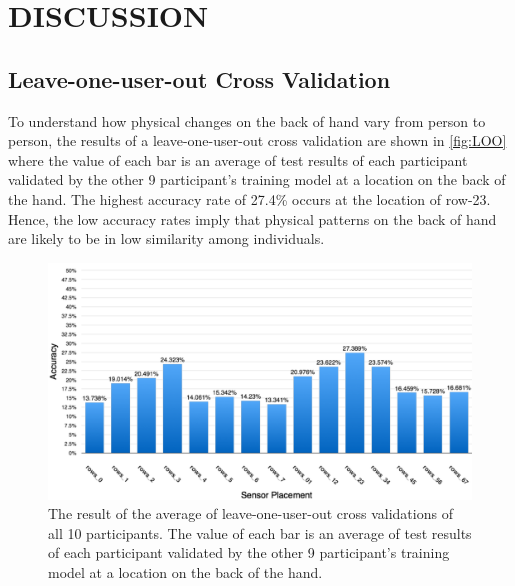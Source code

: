 \documentclass{sigchi}
\begin{document}
\section{DISCUSSION}

\subsection{Leave-one-user-out Cross Validation}
To understand how physical changes on the back of hand vary from person to person, the results of a leave-one-user-out cross validation are shown in \autoref{fig:LOO} where the value of each bar is an average of test results of each participant validated by the other 9 participant's training model at a location on the back of the hand. The highest accuracy rate of 27.4\% occurs at the location of row-23. Hence, the low accuracy rates imply that physical patterns on the back of hand are likely to be in low similarity among individuals.

\begin{figure}
 \begin{center}
  \includegraphics[width=2\columnwidth]{figures/LOO.pdf}
  \caption{
    The result of the average of leave-one-user-out cross validations of all 10 participants.
    The value of each bar is an average of test results of each participant validated by the other 9 participant's training model at a location on the back of the hand.
  }
  \label{fig:LOO}
  \end{center}
\end{figure}
\end{document}
